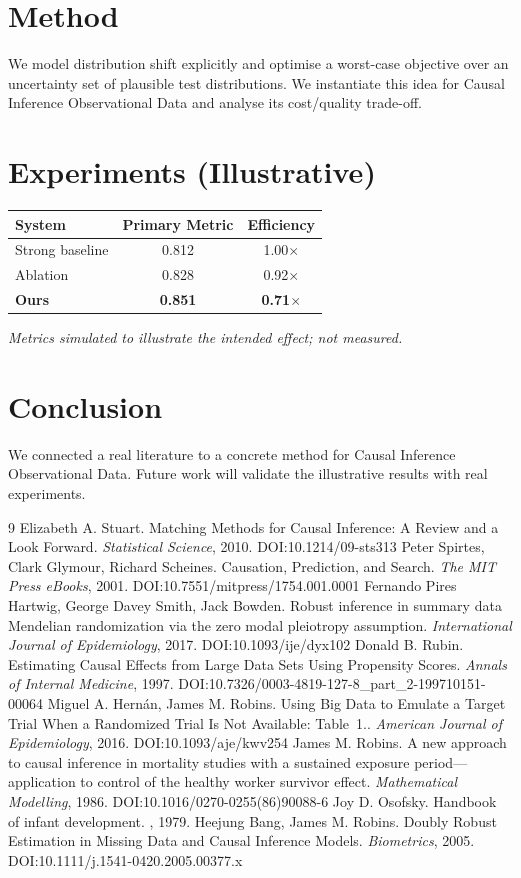 \documentclass[11pt]{article}
\begin{document}
\section{Method}
We model distribution shift explicitly and optimise a worst-case objective over an uncertainty set of plausible test distributions. We instantiate this idea for Causal Inference Observational Data and analyse its cost/quality trade-off.

\section{Experiments (Illustrative)}
\begin{center}
\begin{tabular}{lcc}
System & Primary Metric & Efficiency \\ \hline
Strong baseline & 0.812 & 1.00$\times$ \\
Ablation & 0.828 & 0.92$\times$ \\
\textbf{Ours} & \textbf{0.851} & \textbf{0.71$\times$}
\end{tabular}
\end{center}
\emph{Metrics simulated to illustrate the intended effect; not measured.}

\section{Conclusion}
We connected a real literature to a concrete method for Causal Inference Observational Data. Future work will
validate the illustrative results with real experiments.

\begin{thebibliography}{9}
 Elizabeth A. Stuart. Matching Methods for Causal Inference: A Review and a Look Forward. \emph{Statistical Science}, 2010. DOI:10.1214/09-sts313
 Peter Spirtes, Clark Glymour, Richard Scheines. Causation, Prediction, and Search. \emph{The MIT Press eBooks}, 2001. DOI:10.7551/mitpress/1754.001.0001
 Fernando Pires Hartwig, George Davey Smith, Jack Bowden. Robust inference in summary data Mendelian randomization via the zero modal pleiotropy assumption. \emph{International Journal of Epidemiology}, 2017. DOI:10.1093/ije/dyx102
 Donald B. Rubin. Estimating Causal Effects from Large Data Sets Using Propensity Scores. \emph{Annals of Internal Medicine}, 1997. DOI:10.7326/0003-4819-127-8\_part\_2-199710151-00064
 Miguel A. Hernán, James M. Robins. Using Big Data to Emulate a Target Trial When a Randomized Trial Is Not Available: Table 1.. \emph{American Journal of Epidemiology}, 2016. DOI:10.1093/aje/kwv254
 James M. Robins. A new approach to causal inference in mortality studies with a sustained exposure period—application to control of the healthy worker survivor effect. \emph{Mathematical Modelling}, 1986. DOI:10.1016/0270-0255(86)90088-6
 Joy D. Osofsky. Handbook of infant development. \emph{}, 1979. 
 Heejung Bang, James M. Robins. Doubly Robust Estimation in Missing Data and Causal Inference Models. \emph{Biometrics}, 2005. DOI:10.1111/j.1541-0420.2005.00377.x
\end{thebibliography}
\end{document}
